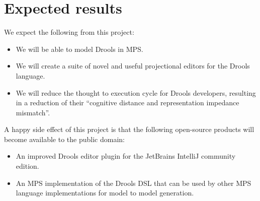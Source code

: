 \section{Expected results} 

We expect the following from this project:
\begin{itemize}[topsep=2pt,itemsep=2pt,partopsep=2pt, parsep=2pt]
    \item We will be able to model Drools in MPS.
    \item We will create a suite of novel and useful projectional editors for the Drools language.
    \item We will reduce the thought to execution cycle for Drools developers, resulting in a reduction of their ``cognitive distance and representation impedance mismatch''\cite{live_literals}.
\end{itemize}

A happy side effect of this project is that the following open-source products will become available to the public domain:
\begin{itemize}[topsep=2pt,itemsep=2pt,partopsep=2pt, parsep=2pt]
    \item An improved Drools editor plugin for the JetBrains IntelliJ community edition.
	\item An MPS implementation of the Drools DSL that can be used by other MPS language implementations for model to model generation.
\end{itemize}


